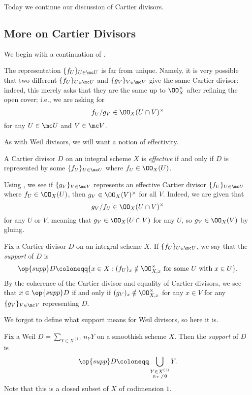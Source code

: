 \documentclass[../notes.tex]{subfiles}
\begin{document}
Today we continue our discussion of Cartier divisors.

\subsection{More on Cartier Divisors}
We begin with a continuation of .
\begin{remark} \label{rem:eq-for-cartier}
	The representation $\{f_U\}_{U\in\mc U}$ is far from unique. Namely, it is very possible that two different $\{f_U\}_{U\in\mc U}$ and $\{g_V\}_{V\in\mc V}$ give the same Cartier divisor: indeed, this merely asks that they are the same up to $\OO_X^\times$ after refining the open cover; i.e., we are asking for
	\[f_U/g_V\in\OO_X(U\cap V)^\times\]
	for any $U\in\mc U$ and $V\in\mc V$.
\end{remark}
As with Weil divisors, we will want a notion of effectivity.
\begin{defihelper}[effective] 
	A Cartier divisor $D$ on an integral scheme $X$ is \textit{effective} if and only if $D$ is represented by some $\{f_U\}_{U\in\mc U}$ where $f_U\in\OO_X(U)$.
\end{defihelper}
\begin{remark}
	Using , we see if $\{g_V\}_{V\in\mc V}$ represents an effective Cartier divisor $\{f_U\}_{U\in\mc U}$ where $f_U\in\OO_X(U)$, then $g_V\in\OO_X(V)^\times$ for all $V$. Indeed, we are given that
	\[g_V/f_U\in\OO_X(U\cap V)^\times\]
	for any $U$ or $V$, meaning that $g_V\in\OO_X(U\cap V)$ for any $U$, so $g_V\in\OO_X(V)$ by gluing.
\end{remark}
\begin{defihelper}[support] 
	Fix a Cartier divisor $D$ on an integral scheme $X$. If $\{f_U\}_{U\in\mc U}$, we say that the \textit{support} of $D$ is
	\[\op{supp}D\coloneqq\{x\in X:(f_U)_x\notin\OO_{X,x}^\times\text{ for some }U\text{ with }x\in U\}.\]
	By the coherence of the Cartier divisor and equality of Cartier divisors, we see that $x\in\op{supp}D$ if and only if $(g_V)_x\notin\OO_{X,x}^\times$ for any $x\in V$ for any $\{g_V\}_{V\in\mc V}$ representing $D$.
\end{defihelper}
We forgot to define what support means for Weil divisors, so here it is.
\begin{defihelper}[support] 
	Fix a Weil $D=\sum_{Y\in X^{(1)}}n_YY$ on a smoothish scheme $X$. Then the \textit{support} of $D$ is
	\[\op{supp}D\coloneqq\bigcup_{\substack{Y\in X^{(1)}\\n_Y\ne0}}Y.\]
	Note that this is a closed subset of $X$ of codimension $1$.
\end{defihelper}
\end{document}
